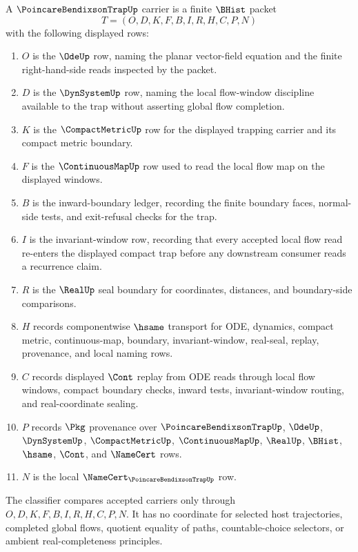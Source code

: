 \begin{definition}
\label{def:poincare-bendixson-trap-carrier}
A $\PoincareBendixsonTrapUp$ carrier is a finite $\BHist$ packet
$$
T=(O,D,K,F,B,I,R,H,C,P,N)
$$
with the following displayed rows:
\begin{enumerate}
\item $O$ is the $\OdeUp$ row, naming the planar vector-field equation and the finite right-hand-side reads inspected by the packet.
\item $D$ is the $\DynSystemUp$ row, naming the local flow-window discipline available to the trap without asserting global flow completion.
\item $K$ is the $\CompactMetricUp$ row for the displayed trapping carrier and its compact metric boundary.
\item $F$ is the $\ContinuousMapUp$ row used to read the local flow map on the displayed windows.
\item $B$ is the inward-boundary ledger, recording the finite boundary faces, normal-side tests, and exit-refusal checks for the trap.
\item $I$ is the invariant-window row, recording that every accepted local flow read re-enters the displayed compact trap before any downstream consumer reads a recurrence claim.
\item $R$ is the $\RealUp$ seal boundary for coordinates, distances, and boundary-side comparisons.
\item $H$ records componentwise $\hsame$ transport for ODE, dynamics, compact metric, continuous-map, boundary, invariant-window, real-seal, replay, provenance, and local naming rows.
\item $C$ records displayed $\Cont$ replay from ODE reads through local flow windows, compact boundary checks, inward tests, invariant-window routing, and real-coordinate sealing.
\item $P$ records $\Pkg$ provenance over $\PoincareBendixsonTrapUp$, $\OdeUp$, $\DynSystemUp$, $\CompactMetricUp$, $\ContinuousMapUp$, $\RealUp$, $\BHist$, $\hsame$, $\Cont$, and $\NameCert$ rows.
\item $N$ is the local $\NameCert_{\PoincareBendixsonTrapUp}$ row.
\end{enumerate}
The classifier compares accepted carriers only through $O,D,K,F,B,I,R,H,C,P,N$. It has no coordinate for selected host trajectories, completed global flows, quotient equality of paths, countable-choice selectors, or ambient real-completeness principles.
\end{definition}

